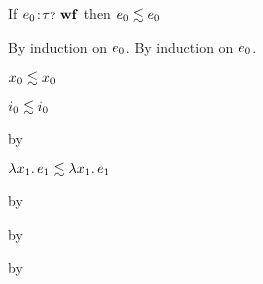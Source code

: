 \begin{lemma}
  If\/ $e_0\!:\!{\tau{\scriptstyle ?}}~\mathbf{wf}$
  then\/ $e_0 \lesssim e_0$
\end{lemma}{
  \newcommand{\shortpf}{By induction on $\sexpr_0$.}
\begin{lamportproof*}
  \shortpf
\mainproof
  \shortpf

    \begin{pfproof}
      \qedstep
        \begin{pfproof}
          $x_0 \lesssim x_0$
        \end{pfproof}
    \end{pfproof}

    \begin{pfproof}
      \qedstep
        \begin{pfproof}
          $i_0 \lesssim i_0$
        \end{pfproof}
    \end{pfproof}

    \begin{pfproof}
        \begin{pfproof}
          by \pfih
        \end{pfproof}
      \qedstep
        \begin{pfproof}
          $\lambda x_1.\, e_1 \lesssim \lambda x_1.\, e_1$
        \end{pfproof}
    \end{pfproof}

    \begin{pfproof}
      \qedstep
        \begin{pfproof}
          by \pfih
        \end{pfproof}
    \end{pfproof}

    \begin{pfproof}
      \qedstep
        \begin{pfproof}
          by \pfih
        \end{pfproof}
    \end{pfproof}

    \begin{pfproof}
      \qedstep
        \begin{pfproof}
          by \pfih
        \end{pfproof}
    \end{pfproof}


\end{lamportproof*}}
